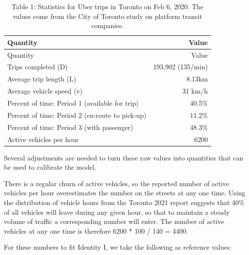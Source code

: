 \documentclass[
  letterpaper,
]{article}
\begin{document}
\begin{longtable}[]{@{}lr@{}}
\caption{Table 1: Statistics for Uber trips in Toronto on Feb 6, 2020.
The values come from the City of Toronto study on platform transit
companies.}\tabularnewline
\toprule()
Quantity & Value \\
\midrule()
\endfirsthead
\toprule()
Quantity & Value \\
\midrule()
\endhead
Trips completed (D) & 193,902 (135/min) \\
Average trip length (L) & 8.13km \\
Average vehicle speed (v) & 31 km/h \\
Percent of time: Period 1 (available for trip) & 40.5\% \\
Percent of time: Period 2 (en-route to pick-up) & 11.2\% \\
Percent of time: Period 3 (with passenger) & 48.3\% \\
Active vehicles per hour & 6200 \\
\bottomrule()
\end{longtable}

Several adjustments are needed to turn these raw values into quantities
that can be used to calibrate the model.

There is a regular churn of active vehicles, so the reported number of
active vehicles per hour overestimates the number on the streets at any
one time. Using the distribution of vehicle hours from the Toronto 2021
report suggests that 40\% of all vehicles will leave during any given
hour, so that to maintain a steady volume of traffic a corresponding
number will enter. The number of active vehicles at any one time is
therefore 6200 * 100 / 140 = 4400.

For these numbers to fit Identity I, we take the following as reference
values:
\end{document}
